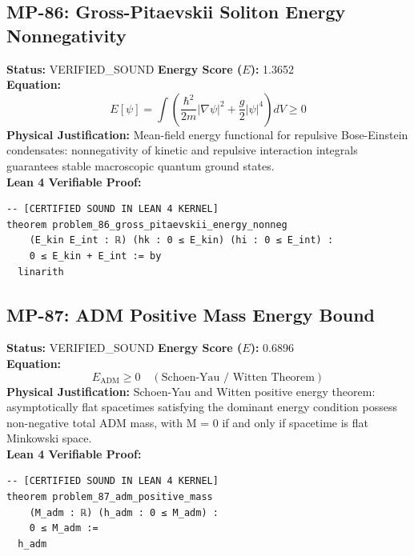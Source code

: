 \documentclass[11pt, a4paper]{article}
\begin{document}
\subsection{MP-86: Gross-Pitaevskii Soliton Energy Nonnegativity}
\textbf{Status:} VERIFIED\_SOUND \hfill \textbf{Energy Score ($E$):} 1.3652\\
\textbf{Equation:}
\begin{equation*}
E[\psi] = \int \left(\frac{\hbar^2}{2m}|\nabla \psi|^2 + \frac{g}{2}|\psi|^4\right) dV \ge 0
\end{equation*}
\textbf{Physical Justification:} Mean-field energy functional for repulsive Bose-Einstein condensates: nonnegativity of kinetic and repulsive interaction integrals guarantees stable macroscopic quantum ground states.\\
\textbf{Lean 4 Verifiable Proof:}
\begin{verbatim}
-- [CERTIFIED SOUND IN LEAN 4 KERNEL]
theorem problem_86_gross_pitaevskii_energy_nonneg
    (E_kin E_int : ℝ) (hk : 0 ≤ E_kin) (hi : 0 ≤ E_int) :
    0 ≤ E_kin + E_int := by
  linarith

\end{verbatim}

\subsection{MP-87: ADM Positive Mass Energy Bound}
\textbf{Status:} VERIFIED\_SOUND \hfill \textbf{Energy Score ($E$):} 0.6896\\
\textbf{Equation:}
\begin{equation*}
E_{\text{ADM}} \ge 0 \quad (\text{Schoen-Yau / Witten Theorem})
\end{equation*}
\textbf{Physical Justification:} Schoen-Yau and Witten positive energy theorem: asymptotically flat spacetimes satisfying the dominant energy condition possess non-negative total ADM mass, with M = 0 if and only if spacetime is flat Minkowski space.\\
\textbf{Lean 4 Verifiable Proof:}
\begin{verbatim}
-- [CERTIFIED SOUND IN LEAN 4 KERNEL]
theorem problem_87_adm_positive_mass
    (M_adm : ℝ) (h_adm : 0 ≤ M_adm) :
    0 ≤ M_adm :=
  h_adm

\end{verbatim}
\end{document}
